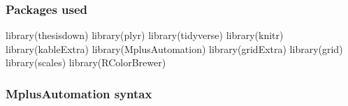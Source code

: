 \documentclass[12pt,a4paper,oneside]{reedthesis}
\newenvironment{Shaded}{\begin{snugshade}}{\end{snugshade}}
\newcommand{\FunctionTok}[1]{\textcolor[rgb]{0.00,0.00,0.00}{#1}}
\newcommand{\NormalTok}[1]{#1}
\begin{document}
\hypertarget{packages-used}{%
\subsubsection{Packages used}\label{packages-used}}
\begin{Shaded}
\begin{Highlighting}[]
\FunctionTok{library}\NormalTok{(thesisdown)}
\FunctionTok{library}\NormalTok{(plyr)}
\FunctionTok{library}\NormalTok{(tidyverse) }
\FunctionTok{library}\NormalTok{(knitr)}
\FunctionTok{library}\NormalTok{(kableExtra)}
\FunctionTok{library}\NormalTok{(MplusAutomation)}
\FunctionTok{library}\NormalTok{(gridExtra)}
\FunctionTok{library}\NormalTok{(grid)}
\FunctionTok{library}\NormalTok{(scales)}
\FunctionTok{library}\NormalTok{(RColorBrewer)}
\end{Highlighting}
\end{Shaded}
\hypertarget{mplusautomation-syntax}{%
\subsubsection{MplusAutomation syntax}\label{mplusautomation-syntax}}
\end{document}
